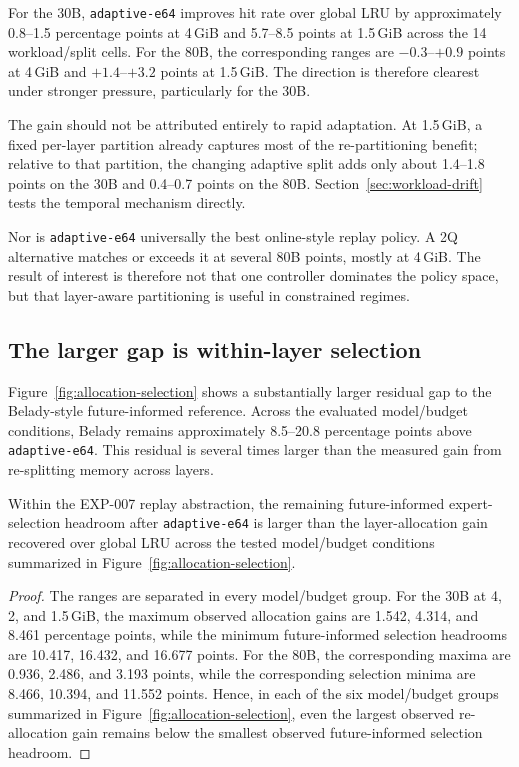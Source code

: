 For the 30B, \texttt{adaptive-e64} improves hit rate over global LRU by approximately 0.8--1.5 percentage points at 4\,GiB and 5.7--8.5 points at 1.5\,GiB across the 14 workload/split cells. For the 80B, the corresponding ranges are $-0.3$--$+0.9$ points at 4\,GiB and $+1.4$--$+3.2$ points at 1.5\,GiB. The direction is therefore clearest under stronger pressure, particularly for the 30B.

The gain should not be attributed entirely to rapid adaptation. At 1.5\,GiB, a fixed per-layer partition already captures most of the re-partitioning benefit; relative to that partition, the changing adaptive split adds only about 1.4--1.8 points on the 30B and 0.4--0.7 points on the 80B. Section~\ref{sec:workload-drift} tests the temporal mechanism directly.

Nor is \texttt{adaptive-e64} universally the best online-style replay policy. A 2Q alternative matches or exceeds it at several 80B points, mostly at 4\,GiB. The result of interest is therefore not that one controller dominates the policy space, but that layer-aware partitioning is useful in constrained regimes.

\subsection{The larger gap is within-layer selection}

Figure~\ref{fig:allocation-selection} shows a substantially larger residual gap to the Belady-style future-informed reference. Across the evaluated model/budget conditions, Belady remains approximately 8.5--20.8 percentage points above \texttt{adaptive-e64}. This residual is several times larger than the measured gain from re-splitting memory across layers.

\begin{proposition}
\label{prop:selection-headroom}
Within the EXP-007 replay abstraction, the remaining future-informed expert-selection headroom after \texttt{adaptive-e64} is larger than the layer-allocation gain recovered over global LRU across the tested model/budget conditions summarized in Figure~\ref{fig:allocation-selection}.
\end{proposition}

\begin{proof}
The ranges are separated in every model/budget group. For the 30B at 4, 2, and 1.5\,GiB, the maximum observed allocation gains are 1.542, 4.314, and 8.461 percentage points, while the minimum future-informed selection headrooms are 10.417, 16.432, and 16.677 points. For the 80B, the corresponding maxima are 0.936, 2.486, and 3.193 points, while the corresponding selection minima are 8.466, 10.394, and 11.552 points. Hence, in each of the six model/budget groups summarized in Figure~\ref{fig:allocation-selection}, even the largest observed re-allocation gain remains below the smallest observed future-informed selection headroom.
\end{proof}

